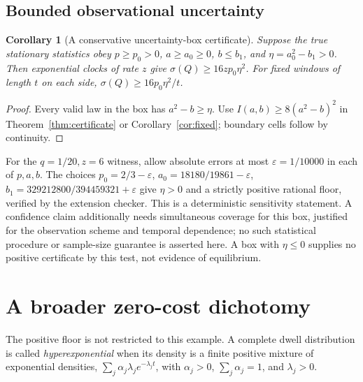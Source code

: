 \documentclass[11pt,a4paper]{article}
\newtheorem{corollary}[theorem]{Corollary}
\newcommand{\sig}{\sigma}
\begin{document}
\subsection{Bounded observational uncertainty}\label{sec:robust}
\begin{corollary}[A conservative uncertainty-box certificate]\label{cor:robust}
Suppose the true stationary statistics obey $p\geq p_0>0$, $a\geq a_0\geq0$, $b\leq b_1$, and $\eta=a_0^2-b_1>0$. Then exponential clocks of rate $z$ give $\sig(Q)\geq16zp_0\eta^2$. For fixed windows of length $t$ on each side, $\sig(Q)\geq16p_0\eta^2/t$.
\end{corollary}
\begin{proof}
Every valid law in the box has $a^2-b\geq\eta$. Use $I(a,b)\geq8(a^2-b)^2$ in Theorem~\ref{thm:certificate} or Corollary~\ref{cor:fixed}; boundary cells follow by continuity.
\end{proof}
For the $q=1/20,z=6$ witness, allow absolute errors at most $\varepsilon=1/10000$ in each of $p,a,b$. The choices $p_0=2/3-\varepsilon$, $a_0=18180/19861-\varepsilon$, $b_1=329212800/394459321+\varepsilon$ give $\eta>0$ and a strictly positive rational floor, verified by the extension checker. This is a deterministic sensitivity statement. A confidence claim additionally needs simultaneous coverage for this box, justified for the observation scheme and temporal dependence; no such statistical procedure or sample-size guarantee is asserted here. A box with $\eta\leq0$ supplies no positive certificate by this test, not evidence of equilibrium.

\section{A broader zero-cost dichotomy}\label{sec:dichotomy}
The positive floor is not restricted to this example. A complete dwell distribution is called \emph{hyperexponential} when its density is a finite positive mixture of exponential densities, $\sum_j\alpha_j\lambda_j e^{-\lambda_jt}$, with $\alpha_j>0$, $\sum_j\alpha_j=1$, and $\lambda_j>0$.
\end{document}
